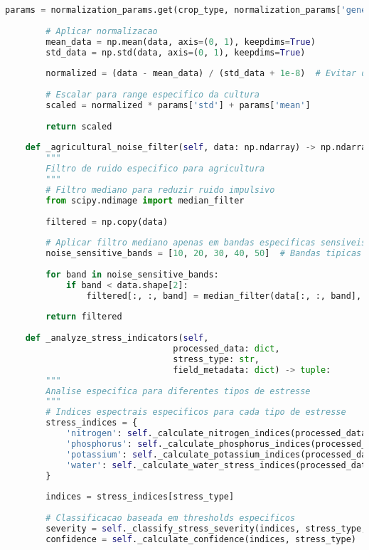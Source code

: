 \begin{lstlisting}[language=Python]
        params = normalization_params.get(crop_type, normalization_params['generic'])
        
        # Aplicar normalizacao
        mean_data = np.mean(data, axis=(0, 1), keepdims=True)
        std_data = np.std(data, axis=(0, 1), keepdims=True)
        
        normalized = (data - mean_data) / (std_data + 1e-8)  # Evitar divisao por zero
        
        # Escalar para range especifico da cultura
        scaled = normalized * params['std'] + params['mean']
        
        return scaled
    
    def _agricultural_noise_filter(self, data: np.ndarray) -> np.ndarray:
        """
        Filtro de ruido especifico para agricultura
        """
        # Filtro mediano para reduzir ruido impulsivo
        from scipy.ndimage import median_filter
        
        filtered = np.copy(data)
        
        # Aplicar filtro mediano apenas em bandas especificas sensiveis ao ruido
        noise_sensitive_bands = [10, 20, 30, 40, 50]  # Bandas tipicas com mais ruido
        
        for band in noise_sensitive_bands:
            if band < data.shape[2]:
                filtered[:, :, band] = median_filter(data[:, :, band], size=3)
        
        return filtered
    
    def _analyze_stress_indicators(self, 
                                 processed_data: dict,
                                 stress_type: str,
                                 field_metadata: dict) -> tuple:
        """
        Analise especifica para diferentes tipos de estresse
        """
        # Indices espectrais especificos para cada tipo de estresse
        stress_indices = {
            'nitrogen': self._calculate_nitrogen_indices(processed_data),
            'phosphorus': self._calculate_phosphorus_indices(processed_data),
            'potassium': self._calculate_potassium_indices(processed_data),
            'water': self._calculate_water_stress_indices(processed_data)
        }
        
        indices = stress_indices[stress_type]
        
        # Classificacao baseada em thresholds especificos
        severity = self._classify_stress_severity(indices, stress_type, field_metadata)
        confidence = self._calculate_confidence(indices, stress_type)
        

\end{lstlisting}
